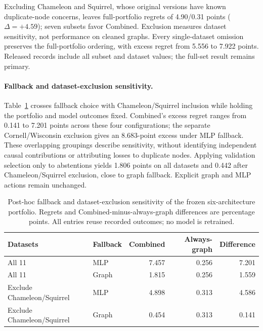 Excluding Chameleon and Squirrel, whose original versions have known duplicate-node concerns, leaves full-portfolio regrets of 4.90/0.31 points ($\Delta=+4.59$); seven subsets favor Combined. Exclusion measures dataset sensitivity, not performance on cleaned graphs. Every single-dataset omission preserves the full-portfolio ordering, with excess regret from 5.556 to 7.922 points. Released records include all subset and dataset values; the full-set result remains primary.

\paragraph{Fallback and dataset-exclusion sensitivity.}
Table~\ref{tab:fallback_sensitivity} crosses fallback choice with Chameleon/Squirrel inclusion while holding the portfolio and model outcomes fixed. Combined's excess regret ranges from 0.141 to 7.201 points across these four configurations; the separate Cornell/Wisconsin exclusion gives an 8.683-point excess under MLP fallback. These overlapping groupings describe sensitivity, without identifying independent causal contributions or attributing losses to duplicate nodes. Applying validation selection only to abstentions yields 1.806 points on all datasets and 0.442 after Chameleon/Squirrel exclusion, close to graph fallback. Explicit graph and MLP actions remain unchanged.

\begin{table}[ht]
\centering
\caption{Post-hoc fallback and dataset-exclusion sensitivity of the frozen six-architecture portfolio. Regrets and Combined-minus-always-graph differences are percentage points. All entries reuse recorded outcomes; no model is retrained.}
\label{tab:fallback_sensitivity}
\small
\setlength{\tabcolsep}{3.5pt}
\begin{tabular}{@{}llrrr@{}}
\toprule
Datasets & Fallback & Combined & Always-graph & Difference \\
\midrule
All 11 & MLP & 7.457 & 0.256 & 7.201 \\
All 11 & Graph & 1.815 & 0.256 & 1.559 \\
Exclude Chameleon/Squirrel & MLP & 4.898 & 0.313 & 4.586 \\
Exclude Chameleon/Squirrel & Graph & 0.454 & 0.313 & 0.141 \\
\bottomrule
\end{tabular}
\end{table}

